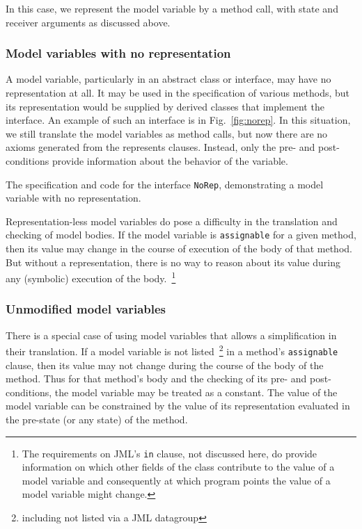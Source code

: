 \documentclass{sig-alternate}
\begin{document}
In this case, we represent the model variable by a method call, with state and receiver arguments
as discussed above.

\subsubsection{Model variables with no representation}

A model variable, particularly in an abstract class or interface, may have no representation
at all.  It may be used in the specification of various methods, but its representation would be
supplied by derived classes that implement the interface.  An example of such an interface is
in Fig.~\ref{fig:norep}.  In this situation, we still translate the model variables as method calls,
but now there are no axioms generated from the represents clauses.  Instead, only the
pre- and post-conditions provide information about the behavior of the variable.

\begin{BFIGURE}

\caption{The specification and code for the interface \texttt{NoRep},
demonstrating a model variable with no representation.}
\label{fig:norep}
\end{BFIGURE}

Representation-less model variables do pose a difficulty in the translation and checking of model bodies.  If the model variable is \texttt{assignable} for a given method, then its value may 
change in the course of execution of the body of that method.  But without a representation,
there is no way to reason about its value during any (symbolic) execution of the 
body.~\footnote{The requirements on JML's  \texttt{in} clause, not discussed here, do provide information
on which other fields of the class contribute to the value of a model variable and consequently
at which program points the value of a model variable might change.}

\subsubsection{Unmodified model variables}

There is a special case of using model variables that allows a simplification in their translation.
If a model variable is not listed~\footnote{including not listed via a JML datagroup} in a
method's \texttt{assignable} clause, then its value may not change during the course of the
body of the method.  Thus for that method's body and the checking of its pre- and
post-conditions, the model variable may be treated as a constant.  The value of the model 
variable can be constrained by the value of its representation evaluated in the pre-state
(or any state) of the method.
\end{document}
